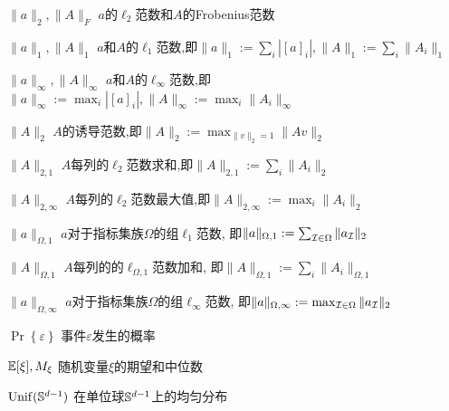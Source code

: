 \begin{denotation}
\item[\(\|a\|_2, \|A\|_F\)] \(a\)的\(\ell_2\)范数和\(A\)的Frobenius范数
\item[\(\|a\|_1, \|A\|_1\) ] \(a\)和\(A\)的\(\ell_1\)范数,即\(\|a\|_1:=\sum_i |[a]_i|, \|A\|_1:=\sum_i \|A_i\|_1\) 
\item[\(\|a\|_\infty, \|A\|_\infty\)] \(a\)和\(A\)的\(\ell_\infty\)范数,即\(\|a\|_\infty:=\max_i |[a]_i|, \|A\|_\infty:=\max_i \|A_i\|_\infty\) 
\item[\(\|A\|_2\)] \(A\)的诱导范数,即\(\|A\|_2:=\max_{\|v\|_2 = 1} \|Av\|_2\)
\item[\(\|A\|_{2,1}\) ] \(A\)每列的\(\ell_2\)范数求和,即\(\|A\|_{2,1}:=\sum_{i} \|A_i\|_2\) 
\item[\(\|A\|_{2,\infty}\) ] \(A\)每列的\(\ell_2\)范数最大值,即\(\|A\|_{2,\infty}:=\max_{i} \|A_i\|_2\) 
\item[\(\|a\|_{\Omega, 1}\) ] \(a\)对于指标集族\(\Omega\)的组\(\ell_1\)范数, 即\(\|a\|_{\Omega, 1} := \sum_{\cI \in \Omega} \|a_{\cI}\|_2\)
\item[\(\|A\|_{\Omega, 1}\) ] \(A\)每列的的\(\ell_{\Omega, 1}\)范数加和,
  即\(\|A\|_{\Omega, 1} := \sum_i \|A_i\|_{\Omega, 1}\)
\item[\(\|a\|_{\Omega, \infty}\) ] \(a\)对于指标集族\(\Omega\)的组\(\ell_\infty\)范数,
  即\(\|a\|_{\Omega, \infty} := \max_{\cI \in \Omega} \|a_{\cI}\|_2\)

\item[\(\Pr\left\{ \varepsilon \right\}\) ] 事件\(\varepsilon\)发生的概率 
\item[\(\E\char"005B\xi\char"005D, M_\xi\)] 随机变量\(\xi\)的期望和中位数 
\item[\(\Unif(\S^{d-1})\)] 在单位球\(\S^{d-1}\)上的均匀分布
\end{denotation}
